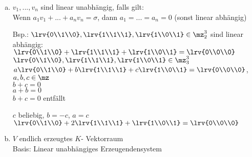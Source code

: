 \begin{enumerate}[a)]
		\item $v_1,...,v_n$ sind linear unabhängig, falls gilt:\\
		Wenn $a_1v_1+...+a_nv_n=\sigma$, dann $a_1=...=a_n=0$ (sonst linear abhängig)

		Bsp.: $\lrv{0\\1\\0},\lrv{1\\1\\1},\lrv{1\\0\\1}\in\mz_2^3$ sind linear abhängig:\\
		$\lrv{0\\1\\0}+\lrv{1\\1\\1}+\lrv{1\\0\\1}=\lrv{0\\0\\0}$\\
		$\lrv{0\\1\\0},\lrv{1\\1\\1},\lrv{1\\0\\1}\in\mz_3^3$\\
		$a\lrv{0\\1\\0}+b\lrv{1\\1\\1}+c\lrv{1\\0\\1}=\lrv{0\\0\\0}$, $a,b,c\in\mz$\\
		$b+c=0$\\
		$a+b=0$\\
		$b+c=0$ entfällt

		$c$ beliebig, $b=-c$, $a=c$\\
		$\lrv{0\\1\\0}+2\lrv{1\\1\\1}+\lrv{1\\0\\1}=\lrv{0\\0\\0}$

		\item $V$ endlich erzeugtes $K$- Vektorraum\\
		Basis: Linear unabhängiges Erzeugendensystem
	\end{enumerate}

